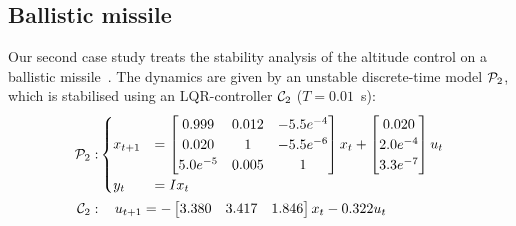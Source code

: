 \subsection{Ballistic missile}\label{sec:eval:unstable}
Our second case study treats the stability analysis of the altitude control on a ballistic missile~\cite{Blakelock:1991, Sree:2006}.
The dynamics are given by an unstable discrete-time model $\mathcal{P}_2$, which is stabilised using an LQR-controller $\mathcal{C}_2$ ($T = 0.01$~s):
\begin{equation*}
    \begin{aligned}
        \mathcal{P}_2: &
        \begin{cases}
            x_{t+1} &= \begin{bmatrix}
                0.999 & 0.012 & -5.5 e^{-4} \\
                0.020 & 1 & -5.5 e^{-6} \\
                5.0 e^{-5} & 0.005 & 1 \\
            \end{bmatrix} x_t + \begin{bmatrix}
                0.020 \\
                2.0e^{-4} \\
                3.3e^{-7} \\
            \end{bmatrix}u_t \\
            y_t &= I x_t
        \end{cases} \\
        \mathcal{C}_2: & \quad\, u_{t+1} = -\begin{bmatrix}
            3.380 & 3.417 & 1.846
        \end{bmatrix} x_t - 0.322 u_t
    \end{aligned}
\end{equation*}

